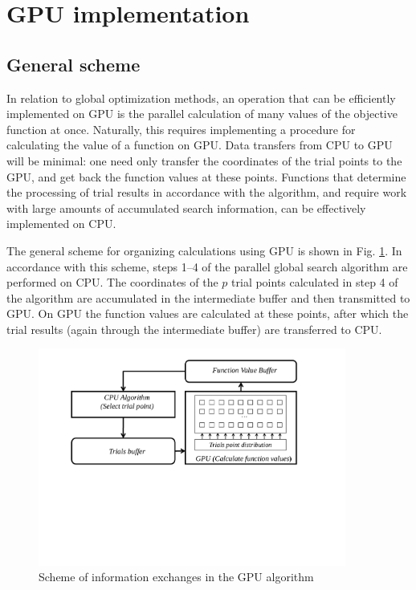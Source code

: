 \documentclass{svproc}
\begin{document}
\section{GPU implementation}

\subsection{General scheme}

In relation to global optimization methods, an operation that can be efficiently implemented on GPU is the parallel calculation of many values of the objective function at once. Naturally, this requires implementing a procedure for calculating the value of a function on GPU. Data transfers from CPU to GPU will be minimal: one need only transfer the coordinates of the trial points to the GPU, and get back the function values at these points. Functions that determine the processing of trial results in accordance with the algorithm, and require work with large amounts of accumulated search information, can be effectively implemented on CPU.

   The general scheme for organizing calculations using GPU is shown in Fig. \ref{fig:GPU_Algorithm}. In accordance with this scheme, steps 1--4 of the parallel global search algorithm are performed on CPU. The coordinates of the $p$ trial points calculated in step 4 of the algorithm are accumulated in the intermediate buffer and then transmitted to GPU. On GPU the function values are calculated at these points, after which the trial results (again through the intermediate buffer) are transferred to CPU.
   
   \begin{figure}[h!]
    \centering
		\includegraphics[width=0.9\textwidth]{GPU_Algorithm.pdf}
		\caption{Scheme of information exchanges in the GPU algorithm}\label{fig:GPU_Algorithm}
\end{figure}
\end{document}
